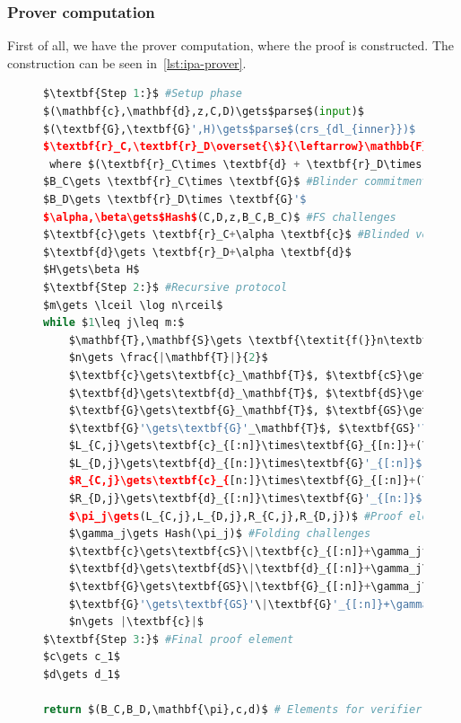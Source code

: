 \subsubsection*{Prover computation}
First of all, we have the prover computation, where the proof is constructed.
The construction can be seen in~\autoref{lst:ipa-prover}.

\begin{figure}[!htb]
    \begin{lstlisting}[language=Python,mathescape=true,label={lst:ipa-prover},numbers=right,caption={Prover computation for CAAU-IPA in CAAUrdleproofs},captionpos=b,frame=single]
$\textbf{Step 1:}$ #Setup phase
$(\mathbf{c},\mathbf{d},z,C,D)\gets$parse$(input)$
$(\textbf{G},\textbf{G}',H)\gets$parse$(crs_{dl_{inner}})$
$\textbf{r}_C,\textbf{r}_D\overset{\$}{\leftarrow}\mathbb{F}^n$ #Vector blinders
 where $(\textbf{r}_C\times \textbf{d} + \textbf{r}_D\times \textbf{c})=0\text{ and }\textbf{r}_C\times \textbf{r}_D=0$
$B_C\gets \textbf{r}_C\times \textbf{G}$ #Blinder commitments
$B_D\gets \textbf{r}_D\times \textbf{G}'$
$\alpha,\beta\gets$Hash$(C,D,z,B_C,B_C)$ #FS challenges
$\textbf{c}\gets \textbf{r}_C+\alpha \textbf{c}$ #Blinded vectors
$\textbf{d}\gets \textbf{r}_D+\alpha \textbf{d}$
$H\gets\beta H$
$\textbf{Step 2:}$ #Recursive protocol
$m\gets \lceil \log n\rceil$
while $1\leq j\leq m:$
    $\mathbf{T},\mathbf{S}\gets \textbf{\textit{f(}}n\textbf{\textit{)}}$ #Scheme function
    $n\gets \frac{|\mathbf{T}|}{2}$
    $\textbf{c}\gets\textbf{c}_\mathbf{T}$, $\textbf{cS}\gets\textbf{c}_\mathbf{S}$ #Vector splitting
    $\textbf{d}\gets\textbf{d}_\mathbf{T}$, $\textbf{dS}\gets\textbf{d}_\mathbf{S}$
    $\textbf{G}\gets\textbf{G}_\mathbf{T}$, $\textbf{GS}\gets\textbf{G}_\mathbf{S}$
    $\textbf{G}'\gets\textbf{G}'_\mathbf{T}$, $\textbf{GS}'\gets\textbf{G}'_\mathbf{S}$
    $L_{C,j}\gets\textbf{c}_{[:n]}\times\textbf{G}_{[n:]}+(\textbf{c}_{[:n]}\times\textbf{d}_{[n:]})H$ #Cross-comm
    $L_{D,j}\gets\textbf{d}_{[n:]}\times\textbf{G}'_{[:n]}$
    $R_{C,j}\gets\textbf{c}_{[n:]}\times\textbf{G}_{[:n]}+(\textbf{c}_{[n:]}\times\textbf{d}_{[:n]})H$
    $R_{D,j}\gets\textbf{d}_{[:n]}\times\textbf{G}'_{[n:]}$
    $\pi_j\gets(L_{C,j},L_{D,j},R_{C,j},R_{D,j})$ #Proof elements
    $\gamma_j\gets Hash(\pi_j)$ #Folding challenges
    $\textbf{c}\gets\textbf{cS}\|\textbf{c}_{[:n]}+\gamma_j^{-1}\textbf{c}_{[n:]}$ #Next round vectors
    $\textbf{d}\gets\textbf{dS}\|\textbf{d}_{[:n]}+\gamma_j\textbf{d}_{[n:]}$
    $\textbf{G}\gets\textbf{GS}\|\textbf{G}_{[:n]}+\gamma_j\textbf{G}_{[n:]}$
    $\textbf{G}'\gets\textbf{GS}'\|\textbf{G}'_{[:n]}+\gamma_j^{-1}\textbf{G}'_{[n:]}$
    $n\gets |\textbf{c}|$
$\textbf{Step 3:}$ #Final proof element
$c\gets c_1$
$d\gets d_1$

return $(B_C,B_D,\mathbf{\pi},c,d)$ # Elements for verifier
    \end{lstlisting}
\label{fig:ipa-prover}
\end{figure}
